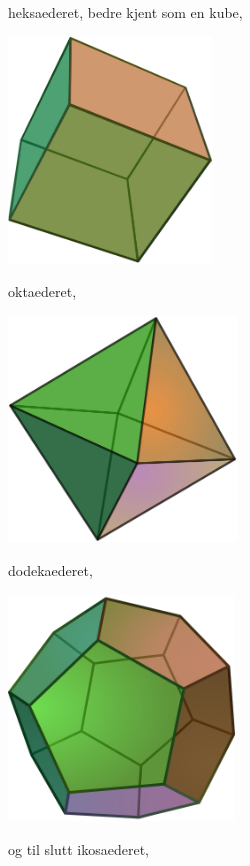 heksaederet, bedre kjent som en kube,

\begin{center}
    \includegraphics[height = 6cm]{img/Hexahedron.png}
\end{center}

oktaederet,

\begin{center}
    \includegraphics[height = 6cm]{img/Octahedron.png}
\end{center}

dodekaederet,

\begin{center}
    \includegraphics[height = 6cm]{img/Dodecahedron.png}
\end{center}

og til slutt ikosaederet, 

